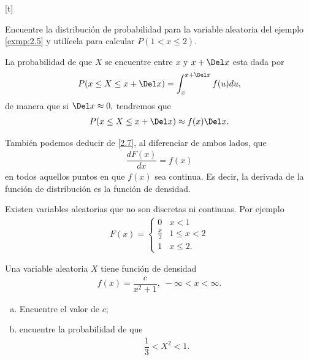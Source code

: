 [t]
	\begin{exmp}
	  \label{exmp:2.6}
	  Encuentre la distribución de probabilidad para la variable aleatoria del ejemplo
	  \ref{exmp:2.5} y utilícela para calcular $P(1 < x \leq 2).$
	\end{exmp}



	La probabilidad de que $X$ se encuentre entre $x$ y $x+\Del x$ esta dada por
	\begin{align}
		\label{2.9}
		P(x \leq X \leq x+\Del x)= \int_{x}^{x+\Del x}f(u)du,
	\end{align} 
	de manera que si $\Del x \approx 0,$ tendremos que
	\begin{align}
		\label{2.10}
		P(x \leq X \leq x+\Del x)\approx f(x) \Del x.
	\end{align}



	También podemos deducir de \eqref{2.7}, al diferenciar de ambos lados, que
	\begin{align}
		\label{2.11}
		\dfrac{dF(x)}{dx} = f(x)
	\end{align}
en todos aquellos puntos en que $f(x)$ sea continua.  Es decir, la derivada de la función de distribución es la función de densidad.


	\begin{rem}
		Existen variables aleatorias que no son discretas ni continuas.  Por ejemplo
		\begin{align}
			F(x)=
			\begin{cases}
				0 & x <1 \\
				\frac{x}{2} & 1 \leq x < 2 \\
				1 & x \leq 2.
			\end{cases}
		\end{align}

	\end{rem}



 \begin{exmp}
  \label{sol:2.5} Una variable aleatoria $X$ tiene función de densidad
  \begin{align}
   f(x)=\dfrac{c}{x^{2}+1}, \; -\infty < x <\infty.
  \end{align}

  \begin{enumerate}[(a)]
   \item Encuentre el valor de $c$; 
   \item encuentre la probabilidad de que
   \begin{align*}
    \dfrac{1}{3}< X^{2} <1.
   \end{align*}

  \end{enumerate}

 \end{exmp}



